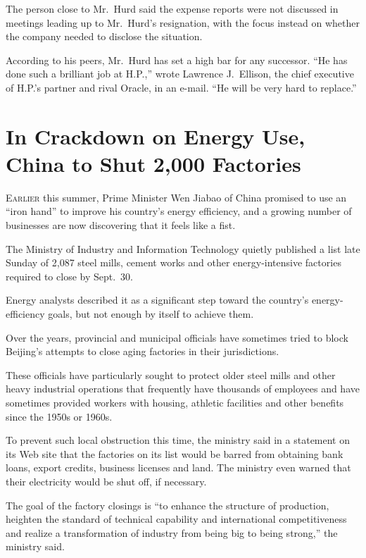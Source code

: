 ﻿\documentclass[12pt]{article}
\begin{document}
The person close to Mr.~Hurd said the expense reports were not discussed in meetings leading up to
Mr.~Hurd's resignation, with the focus instead on whether the company needed to disclose the
situation.

According to his peers, Mr.~Hurd has set a high bar for any successor. ``He has done such a
brilliant job at H.P.,'' wrote Lawrence J.~Ellison, the chief executive of H.P.'s partner and rival
Oracle, in an e-mail. ``He will be very hard to replace.''

\section{In Crackdown on Energy Use, China to Shut 2,000 Factories}

\lettrine{E}{arlier} this summer, Prime Minister Wen Jiabao of China
promised to use an ``iron hand'' to improve his country's energy efficiency, and a growing number of
businesses are now discovering that it feels like a fist.

The Ministry of Industry and Information Technology quietly published a list late Sunday of 2,087
steel mills, cement works and other energy-intensive factories required to close by Sept.~30.

Energy analysts described it as a significant step toward the country's energy-efficiency goals, but
not enough by itself to achieve them.

Over the years, provincial and municipal officials have sometimes tried to block Beijing's attempts
to close aging factories in their jurisdictions.

These officials have particularly sought to protect older steel mills and other heavy industrial
operations that frequently have thousands of employees and have sometimes provided workers with
housing, athletic facilities and other benefits since the 1950s or 1960s.

To prevent such local obstruction this time, the ministry said in a statement on its Web site that
the factories on its list would be barred from obtaining bank loans, export credits, business
licenses and land. The ministry even warned that their electricity would be shut off, if necessary.

The goal of the factory closings is ``to enhance the structure of production, heighten the standard
of technical capability and international competitiveness and realize a transformation of industry
from being big to being strong,'' the ministry said.
\end{document}

